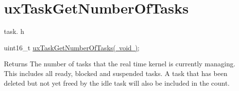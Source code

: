 \hypertarget{group__ux_task_get_number_of_tasks}{}\section{ux\+Task\+Get\+Number\+Of\+Tasks}
\label{group__ux_task_get_number_of_tasks}
task. h 
\begin{DoxyPre}uint16\_t \mbox{\hyperlink{task_8h_a70a89a0f07c7db5d695707d1f6f44a4a}{uxTaskGetNumberOfTasks( void )}};\end{DoxyPre}


\begin{DoxyReturn}{Returns}
The number of tasks that the real time kernel is currently managing. This includes all ready, blocked and suspended tasks. A task that has been deleted but not yet freed by the idle task will also be included in the count. 
\end{DoxyReturn}
